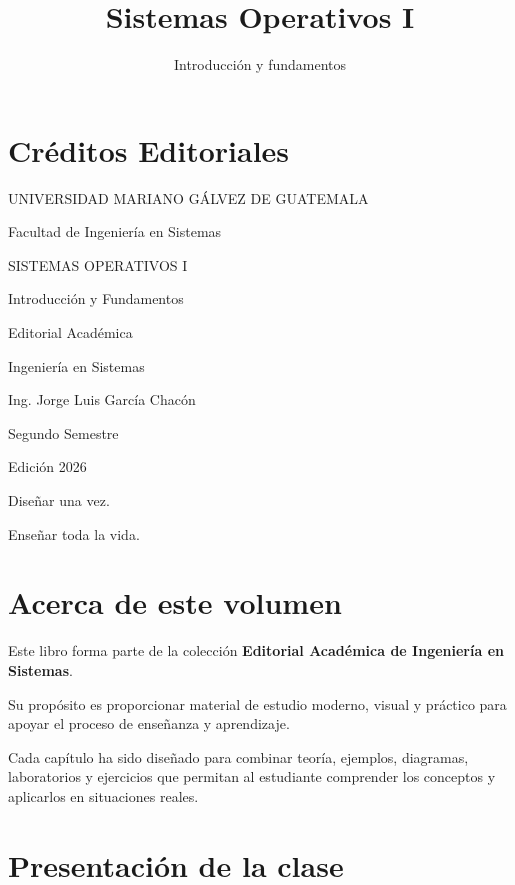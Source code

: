\documentclass[
  spanish,
  letterpaper,
]{scrbook}
\title{Sistemas Operativos I}
\subtitle{Introducción y fundamentos}
\author{}
\date{}
\renewcommand*\contentsname{Tabla de contenidos}
\newcommand\contentsname{Tabla de contenidos}
\begin{document}
\frontmatter
\maketitle

\renewcommand*\contentsname{Contenido}
{
\setcounter{tocdepth}{2}
\tableofcontents
}

\mainmatter
{}

\chapter{Créditos Editoriales}\label{cruxe9ditos-editoriales}

UNIVERSIDAD MARIANO GÁLVEZ DE GUATEMALA

Facultad de Ingeniería en Sistemas

SISTEMAS OPERATIVOS I

Introducción y Fundamentos

Editorial Académica

Ingeniería en Sistemas

Ing. Jorge Luis García Chacón

Segundo Semestre

Edición 2026

Diseñar una vez.

Enseñar toda la vida.


\chapter{Acerca de este volumen}\label{acerca-de-este-volumen}

Este libro forma parte de la colección \textbf{Editorial Académica de
Ingeniería en Sistemas}.

Su propósito es proporcionar material de estudio moderno, visual y
práctico para apoyar el proceso de enseñanza y aprendizaje.

Cada capítulo ha sido diseñado para combinar teoría, ejemplos,
diagramas, laboratorios y ejercicios que permitan al estudiante
comprender los conceptos y aplicarlos en situaciones reales.


\chapter{Presentación de la clase}\label{presentaciuxf3n-de-la-clase}
\end{document}
